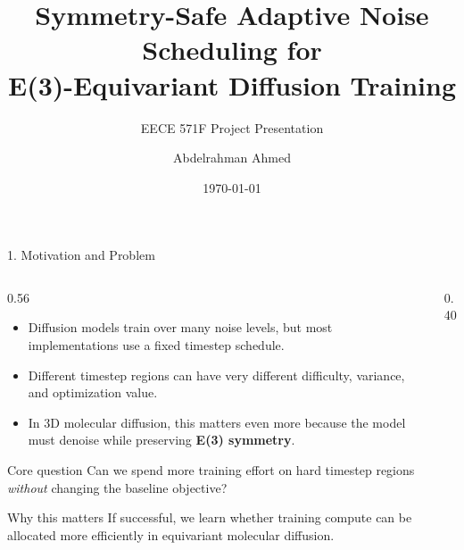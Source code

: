 \documentclass[aspectratio=169,11pt]{beamer}
\title[SAANS]{Symmetry-Safe Adaptive Noise Scheduling for\\E(3)-Equivariant Diffusion Training}
\subtitle{EECE 571F Project Presentation}
\author{Abdelrahman Ahmed}
\date{\today}
\begin{document}
\begin{frame}
    \titlepage
\end{frame}

\begin{frame}{1. Motivation and Problem}
\footnotesize
\begin{columns}[T]
    \begin{column}{0.56\textwidth}
        \begin{itemize}
            \item Diffusion models train over many noise levels, but most implementations use a fixed timestep schedule.
            \item Different timestep regions can have very different difficulty, variance, and optimization value.
            \item In 3D molecular diffusion, this matters even more because the model must denoise while preserving \textbf{E(3) symmetry}.
        \end{itemize}

        \vspace{0.25em}
        \begin{block}{Core question}
        Can we spend more training effort on hard timestep regions \emph{without} changing the baseline objective?
        \end{block}

        \begin{alertblock}{Why this matters}
        If successful, we learn whether training compute can be allocated more efficiently in equivariant molecular diffusion.
        \end{alertblock}
    \end{column}
    \begin{column}{0.40\textwidth}
        \centering
    \end{column}
\end{columns}
\end{frame}
\end{document}
